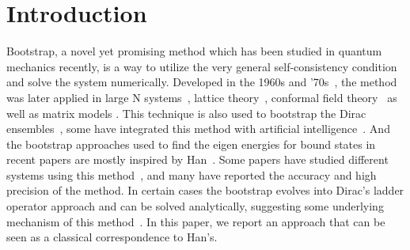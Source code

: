 \documentclass[aps, preprint,amsmath, amssymb]{revtex4-2}
\begin{document}
\maketitle

\section{Introduction}

Bootstrap, a novel yet promising method which has been studied in quantum mechanics recently, is a way to utilize the very general self-consistency condition and solve the system numerically.
Developed in the 1960s and '70s~\cite{enwiki:1195984682}, the method was later applied in large N systems~\cite{JEVICKI1983169, JEVICKI1984299, RODRIGUES1985350}, lattice theory~\cite{ANDERSON2017702, lawrence2021bootstrapping, Kazakov_2023, refId0}, conformal field theory~\cite{RevModPhys.91.015002, PhysRevLett.127.081601, PhysRevD.86.025022, El_Showk_2012, El_Showk_2014, Simmons_Duffin_2017} as well as matrix models \cite{Lin_2020, Kazakov_2022}. This technique is also used to bootstrap the Dirac ensembles~\cite{Hessam_2022}, some have integrated this method with artificial intelligence~\cite{K_ntor_2022, K_ntor_20221}.
And the bootstrap approaches used to find the eigen energies for bound states in recent papers are mostly inspired by Han~\cite{Han_2020}. Some papers have studied different systems using this method~\cite{Bhattacharya:2021btd, Berenstein:2021loy, Du:2021hfw, Aikawa_2022, Tchoumakov_2021, bai2022bootstrapping, Berenstein:2021dyf}, and many have reported the accuracy and high precision of the method.
In certain cases the bootstrap evolves into Dirac's ladder operator approach and can be solved analytically, suggesting some underlying mechanism of this method~\cite{Aikawa:2021qbl}. In this paper, we report an approach that can be seen as a classical correspondence to Han's.
\end{document}

